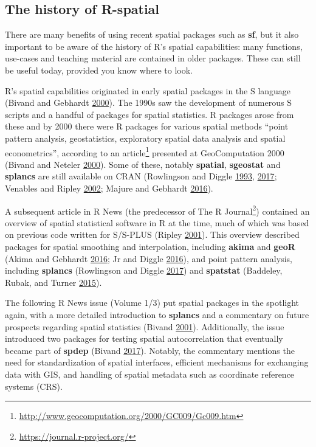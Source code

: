 \documentclass[]{krantz}
\let\rmarkdownfootnote\footnote%
\def\footnote{\protect\rmarkdownfootnote}
\renewcommand{\href}[2]{#2\footnote{\url{#1}}}
\begin{document}
\hypertarget{the-history-of-r-spatial}{%
\subsection{The history of R-spatial}\label{the-history-of-r-spatial}}

There are many benefits of using recent spatial packages such as \textbf{sf}, but it also important to be aware of the history of R's spatial capabilities: many functions, use-cases and teaching material are contained in older packages.
These can still be useful today, provided you know where to look.

R's spatial capabilities originated in early spatial packages in the S language (Bivand and Gebhardt \protect\hyperlink{ref-bivand_implementing_2000}{2000}).
The 1990s saw the development of numerous S scripts and a handful of packages for spatial statistics.
R packages arose from these and by 2000 there were R packages for various spatial methods ``point pattern analysis, geostatistics, exploratory spatial data analysis and spatial econometrics'', according to an \href{http://www.geocomputation.org/2000/GC009/Gc009.htm}{article} presented at GeoComputation 2000 (Bivand and Neteler \protect\hyperlink{ref-bivand_open_2000}{2000}).
Some of these, notably \textbf{spatial}, \textbf{sgeostat} and \textbf{splancs} are still available on CRAN (Rowlingson and Diggle \protect\hyperlink{ref-rowlingson_splancs_1993}{1993}, \protect\hyperlink{ref-rowlingson_splancs_2017}{2017}; Venables and Ripley \protect\hyperlink{ref-venables_modern_2002}{2002}; Majure and Gebhardt \protect\hyperlink{ref-majure_sgeostat_2016}{2016}).

A subsequent article in R News (the predecessor of \href{https://journal.r-project.org/}{The R Journal}) contained an overview of spatial statistical software in R at the time, much of which was based on previous code written for S/S-PLUS (Ripley \protect\hyperlink{ref-ripley_spatial_2001}{2001}).
This overview described packages for spatial smoothing and interpolation, including \textbf{akima} and \textbf{geoR} (Akima and Gebhardt \protect\hyperlink{ref-akima_akima_2016}{2016}; Jr and Diggle \protect\hyperlink{ref-jr_geor_2016}{2016}), and point pattern analysis, including \textbf{splancs} (Rowlingson and Diggle \protect\hyperlink{ref-rowlingson_splancs_2017}{2017}) and \textbf{spatstat} (Baddeley, Rubak, and Turner \protect\hyperlink{ref-baddeley_spatial_2015}{2015}).

The following R News issue (Volume 1/3) put spatial packages in the spotlight again, with a more detailed introduction to \textbf{splancs} and a commentary on future prospects regarding spatial statistics (Bivand \protect\hyperlink{ref-bivand_more_2001}{2001}).
Additionally, the issue introduced two packages for testing spatial autocorrelation that eventually became part of \textbf{spdep} (Bivand \protect\hyperlink{ref-bivand_spdep_2017}{2017}).
Notably, the commentary mentions the need for standardization of spatial interfaces, efficient mechanisms for exchanging data with GIS, and handling of spatial metadata such as coordinate reference systems (CRS).
\end{document}
